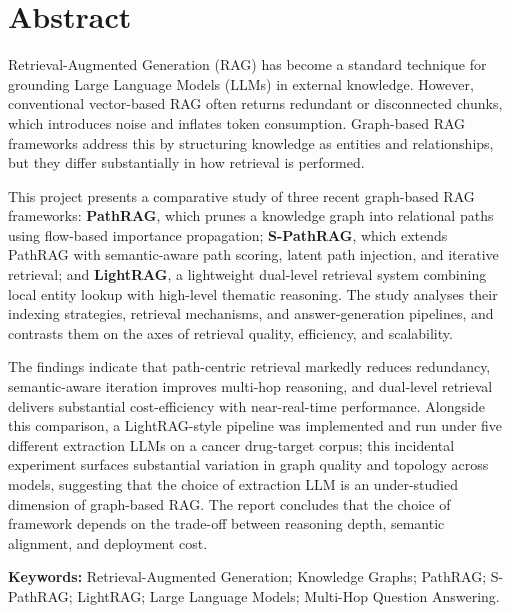 \documentclass[12pt,a4paper,oneside]{report}
\begin{document}
\pagestyle{fancy}
\setcounter{page}{1}

\chapter{Abstract}
\label{ch:abstract}

Retrieval-Augmented Generation (RAG) has become a standard technique for
grounding Large Language Models (LLMs) in external knowledge. However,
conventional vector-based RAG often returns redundant or disconnected chunks,
which introduces noise and inflates token consumption. Graph-based RAG
frameworks address this by structuring knowledge as entities and relationships,
but they differ substantially in how retrieval is performed.

This project presents a comparative study of three recent graph-based RAG
frameworks: \textbf{PathRAG}, which prunes a knowledge graph into relational
paths using flow-based importance propagation; \textbf{S-PathRAG}, which
extends PathRAG with semantic-aware path scoring, latent path injection, and
iterative retrieval; and \textbf{LightRAG}, a lightweight dual-level retrieval
system combining local entity lookup with high-level thematic reasoning. The
study analyses their indexing strategies, retrieval mechanisms, and
answer-generation pipelines, and contrasts them on the axes of retrieval
quality, efficiency, and scalability.

The findings indicate that path-centric retrieval markedly reduces redundancy,
semantic-aware iteration improves multi-hop reasoning, and dual-level
retrieval delivers substantial cost-efficiency with near-real-time performance.
Alongside this comparison, a LightRAG-style pipeline was implemented and
run under five different extraction LLMs on a cancer drug-target corpus;
this incidental experiment surfaces substantial variation in graph
quality and topology across models, suggesting that the choice of
extraction LLM is an under-studied dimension of graph-based RAG.
The report concludes that the choice of framework depends on the trade-off
between reasoning depth, semantic alignment, and deployment cost.

\vspace{1em}
\noindent\textbf{Keywords:} Retrieval-Augmented Generation; Knowledge Graphs;
PathRAG; S-PathRAG; LightRAG; Large Language Models; Multi-Hop Question
Answering.
\end{document}
